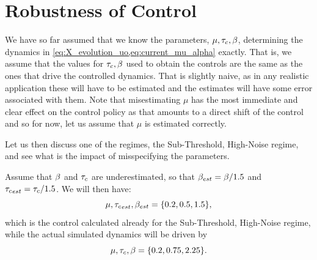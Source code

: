\documentclass[12pt]{iopart}
\begin{document}
% 

\section{Robustness of Control}
We have so far assumed that we know the parameters, ${\mu }, { \tau_{c} }, {\beta}$, determining
the dynamics in \cref{eq:X_evolution_uo,eq:current_mu_alpha} exactly. That is,
we assume that the values for ${ \tau_{c} }, {\beta}$ used to obtain the controls are the same
as the ones that drive the controlled dynamics. That is slightly naive, as in
any realistic application these will have to be estimated and the estimates will
have some error associated with them. Note that misestimating $\mu$ has the most
immediate and clear effect on the control policy as that amounts to a direct
shift of the control and so for now, let us assume that $\mu$ is estimated
correctly.

Let us then discuss one of the regimes, the Sub-Threshold,
High-Noise regime, and see what is the impact of misspecifying the parameters.

Assume that ${\beta}$ and ${ \tau_{c} }$ are underestimated, so that ${\beta}_{est} = {\beta} / 1.5$
and ${ \tau_{c} }_{est} = { \tau_{c} } / 1.5$. We will then have: 
$$\mu, { \tau_{c} }_{est}, {\beta}_{est} = \{0.2, 0.5, 1.5 \},$$ which is the control
calculated already for the Sub-Threshold,
High-Noise regime, while the actual simulated dynamics will be driven by
$$\mu, { \tau_{c} }, {\beta} = \{0.2, 0.75, 2.25 \}.$$
\end{document}
